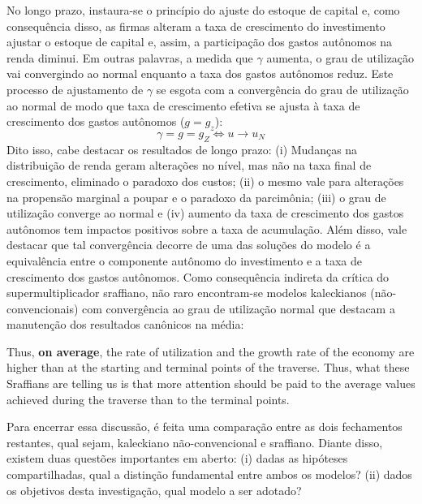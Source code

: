 No longo prazo, instaura-se o princípio do ajuste do estoque de capital e, como consequência disso, as firmas alteram a taxa de crescimento do investimento ajustar o estoque de capital e, assim, a participação dos gastos autônomos na renda diminui.
Em outras palavras, a medida que $\gamma$ aumenta, o grau de utilização vai convergindo ao normal enquanto a taxa dos gastos autônomos reduz.
Este processo de ajustamento de $\gamma$ se esgota com a convergência do grau de utilização ao normal de modo que 
taxa de crescimento efetiva se ajusta à taxa de crescimento dos gastos autônomos ($g = g_z$): 
$$
\gamma = g = g_Z \Leftrightarrow u \to u_N
$$
Dito isso, cabe destacar os resultados de longo prazo:
(i) Mudanças na distribuição de renda geram alterações no nível, mas não na taxa final de crescimento, eliminado o paradoxo dos custos; 
(ii) o mesmo vale para alterações na propensão marginal a poupar e o paradoxo da parcimônia; 
(iii) o grau de utilização converge ao normal e 
(iv) aumento da taxa de crescimento dos gastos autônomos tem impactos positivos sobre a taxa de acumulação.
Além disso, vale destacar que tal convergência decorre de uma das soluções do modelo é a equivalência entre o componente autônomo do investimento e a taxa de crescimento dos gastos autônomos. Como consequência indireta da crítica do supermultiplicador sraffiano, não raro encontram-se modelos kaleckianos (não-convencionais) com convergência ao grau de utilização normal que destacam a manutenção dos resultados canônicos na média:
	
	\begin{citacao}
		Thus, \textbf{on average}, the rate of utilization and the growth rate of the economy are higher than at the starting and terminal points of the traverse. Thus, what these Sraffians are telling us is that more attention should be paid to the average values
		achieved during the traverse than to the terminal points. \cite[p.~408, grifos adicionados]{lavoie_post-keynesian_2015}
	\end{citacao}	

Para encerrar essa discussão, é feita uma comparação entre as dois fechamentos restantes, qual sejam, kaleckiano não-convencional e sraffiano.  Diante disso, existem duas questões importantes em aberto: (i) dadas as hipóteses compartilhadas, qual a distinção fundamental entre ambos os modelos? (ii) dados os objetivos desta investigação, qual modelo a ser adotado? 

